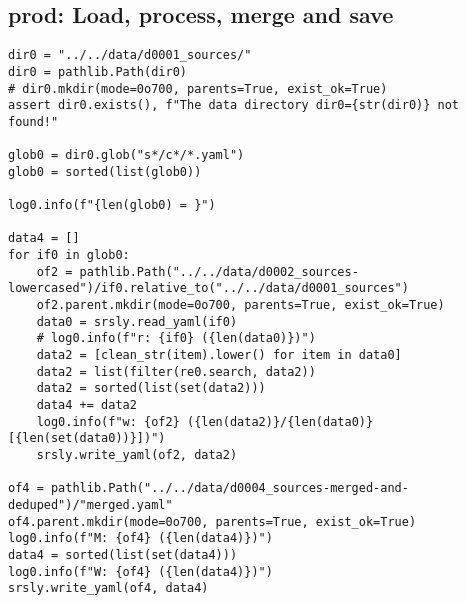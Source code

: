 \documentclass[a4paper,10pt,onecolumn,oneside,openright]{article}
\begin{document}
\subsection{prod: Load, process, merge and save}
\label{sec:org2ecf0a8}
\begin{verbatim}
dir0 = "../../data/d0001_sources/"
dir0 = pathlib.Path(dir0)
# dir0.mkdir(mode=0o700, parents=True, exist_ok=True)
assert dir0.exists(), f"The data directory dir0={str(dir0)} not found!"

glob0 = dir0.glob("s*/c*/*.yaml")
glob0 = sorted(list(glob0))

log0.info(f"{len(glob0) = }")

data4 = []
for if0 in glob0:
    of2 = pathlib.Path("../../data/d0002_sources-lowercased")/if0.relative_to("../../data/d0001_sources")
    of2.parent.mkdir(mode=0o700, parents=True, exist_ok=True)
    data0 = srsly.read_yaml(if0)
    # log0.info(f"r: {if0} ({len(data0)})")
    data2 = [clean_str(item).lower() for item in data0]
    data2 = list(filter(re0.search, data2))
    data2 = sorted(list(set(data2)))
    data4 += data2
    log0.info(f"w: {of2} ({len(data2)}/{len(data0)} [{len(set(data0))}])")
    srsly.write_yaml(of2, data2)

of4 = pathlib.Path("../../data/d0004_sources-merged-and-deduped")/"merged.yaml"
of4.parent.mkdir(mode=0o700, parents=True, exist_ok=True)
log0.info(f"M: {of4} ({len(data4)})")
data4 = sorted(list(set(data4)))
log0.info(f"W: {of4} ({len(data4)})")
srsly.write_yaml(of4, data4)
\end{verbatim}
\end{document}
